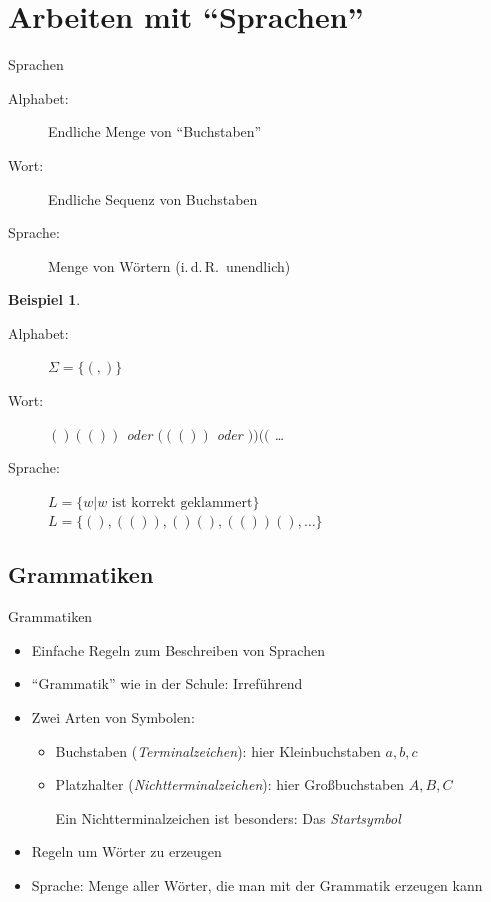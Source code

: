 \documentclass{beamer}
\theoremstyle{example}
\newtheorem{ex}{Beispiel}
\renewenvironment{example}{\begin{ex}}{\end{ex}}
\begin{document}
\section{Arbeiten mit ``Sprachen''}
\begin{frame}{Sprachen}
  \begin{definition}
    \begin{description}
    \item[Alphabet:] Endliche Menge von ``Buchstaben''
    \item[Wort:] Endliche Sequenz von Buchstaben
    \item[Sprache:] Menge von Wörtern (i.\,d.\,R.\ unendlich)
    \end{description}
  \end{definition}
  \begin{example}
    \begin{description}
    \item[Alphabet:] $\Sigma = \{ (,)\}$
    \item[Wort:] $()(())$ oder $((())$ oder $))(($ \ldots
    \item[Sprache:] $L=\{w | \text{$w$ ist korrekt geklammert}\}$
      $L = \{(),(()),()(),(())(),\ldots\}$
    \end{description}
  \end{example}
\end{frame}

\subsection{Grammatiken}
\begin{frame}{Grammatiken}
  \begin{itemize}
  \item Einfache Regeln zum Beschreiben von Sprachen
  \item ``Grammatik'' wie in der Schule: Irreführend
  \item Zwei Arten von Symbolen:
    \begin{itemize}
    \item Buchstaben (\emph{Terminalzeichen}): hier Kleinbuchstaben $a,b,c$
    \item Platzhalter (\emph{Nichtterminalzeichen}): hier Großbuchstaben $A,B,C$

      Ein Nichtterminalzeichen ist besonders: Das \emph{Startsymbol}
    \end{itemize}
  \item Regeln um Wörter zu erzeugen
  \item Sprache: Menge aller Wörter, die man mit der Grammatik erzeugen kann
  \end{itemize}
\end{frame}
\end{document}
